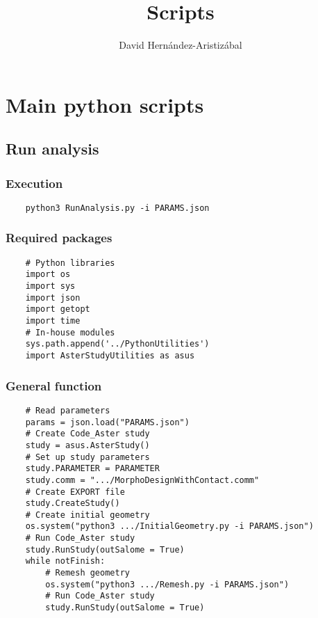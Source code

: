 \documentclass{article}
\title{Scripts}
\author{David Hernández-Aristizábal}
\begin{document}
\hypersetup{linkcolor = BlueHTML}

\maketitle
\tableofcontents

\section{Main python scripts}
\subsection{Run analysis}
\subsubsection{Execution}
\begin{verbatim}
    python3 RunAnalysis.py -i PARAMS.json
\end{verbatim}
\subsubsection{Required packages}
\begin{verbatim}
    # Python libraries
    import os
    import sys
    import json
    import getopt
    import time
    # In-house modules
    sys.path.append('../PythonUtilities')
    import AsterStudyUtilities as asus
\end{verbatim}
\subsubsection{General function}
\begin{verbatim}
    # Read parameters
    params = json.load("PARAMS.json")
    # Create Code_Aster study
    study = asus.AsterStudy()
    # Set up study parameters
    study.PARAMETER = PARAMETER
    study.comm = ".../MorphoDesignWithContact.comm"
    # Create EXPORT file
    study.CreateStudy()
    # Create initial geometry
    os.system("python3 .../InitialGeometry.py -i PARAMS.json")
    # Run Code_Aster study
    study.RunStudy(outSalome = True)
    while notFinish:
        # Remesh geometry
        os.system("python3 .../Remesh.py -i PARAMS.json")
        # Run Code_Aster study
        study.RunStudy(outSalome = True)

\end{verbatim}
\end{document}

